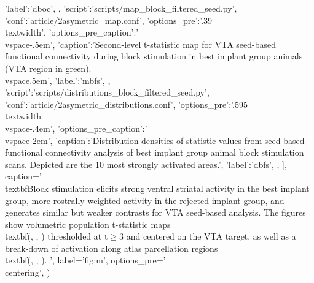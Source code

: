 \begin{sansmath}
{{                        'label':'dboc',
                        },
                {'script':'scripts/map_block_filtered_seed.py', 'conf':'article/2asymetric_map.conf',
                        'options_pre':'{.39\\textwidth}',
                        'options_pre_caption':'\\vspace{-.5em}',
                        'caption':'Second-level t-statistic map for VTA seed-based functional connectivity during block stimulation in best implant group animals (VTA region in green).\\vspace{.5em}',
                        'label':'mbfs',
                        },
                {'script':'scripts/distributions_block_filtered_seed.py', 'conf':'article/2asymetric_distributions.conf',
                        'options_pre':'{.595\\textwidth}\\vspace{-.4em}',
                        'options_pre_caption':'\\vspace{-2em}',
                        'caption':'Distribution densities of statistic values from seed-based functional connectivity analysis of best implant group animal block stimulation scans. Depicted are the 10 most strongly activated areas.',
                        'label':'dbfs',
                        },
                ],
        caption='
                \\textbf{Block stimulation elicits strong ventral striatal activity in the best implant group, more rostrally weighted activity in the rejected implant group, and generates similar but weaker contrasts for VTA seed-based analysis.}
                The figures show volumetric population t-statistic maps \\textbf{(, , )} thresholded at $\mathrm{t \geq 3}$ and centered on the VTA target, as well as a break-down of activation along atlas parcellation regions \\textbf{(, , )}.
                ',
        label='fig:m',
        options_pre='\\centering',
        )}
\end{sansmath}

